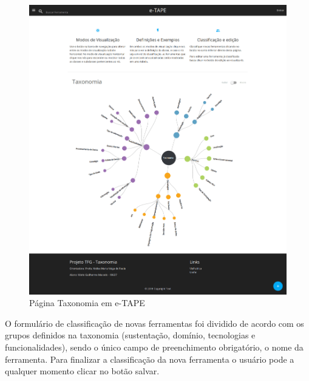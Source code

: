 \begin{figure}[!ht]
    \centering
    \includegraphics[scale=0.10]{./figuras/pagina-taxonomia.png}
    \caption{Página Taxonomia em e-TAPE }
    \label{fig:pag-taxonomia}
\end{figure}

\par
O formulário de classificação de novas ferramentas foi dividido de acordo com os grupos definidos na taxonomia 
(sustentação, domínio, tecnologias e funcionalidades), sendo o único campo de preenchimento obrigatório, o nome da ferramenta.
Para finalizar a classificação da nova ferramenta o usuário pode a qualquer momento clicar no botão salvar. 

